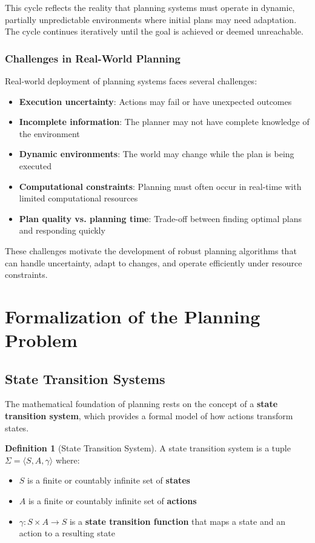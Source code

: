 \documentclass[11pt,a4paper]{article}
\theoremstyle{definition}
\newtheorem{definition}{Definition}[section]
\theoremstyle{plain}
\theoremstyle{remark}
\begin{document}
This cycle reflects the reality that planning systems must operate in dynamic, partially unpredictable environments where initial plans may need adaptation. The cycle continues iteratively until the goal is achieved or deemed unreachable.

\subsubsection{Challenges in Real-World Planning}

Real-world deployment of planning systems faces several challenges:

\begin{itemize}
    \item \textbf{Execution uncertainty}: Actions may fail or have unexpected outcomes
    \item \textbf{Incomplete information}: The planner may not have complete knowledge of the environment
    \item \textbf{Dynamic environments}: The world may change while the plan is being executed
    \item \textbf{Computational constraints}: Planning must often occur in real-time with limited computational resources
    \item \textbf{Plan quality vs. planning time}: Trade-off between finding optimal plans and responding quickly
\end{itemize}

These challenges motivate the development of robust planning algorithms that can handle uncertainty, adapt to changes, and operate efficiently under resource constraints.

\newpage

\section{Formalization of the Planning Problem}

\subsection{State Transition Systems}

The mathematical foundation of planning rests on the concept of a \textbf{state transition system}, which provides a formal model of how actions transform states.

\begin{definition}[State Transition System]
A state transition system is a tuple $\Sigma = \langle S, A, \gamma \rangle$ where:
\begin{itemize}
    \item $S$ is a finite or countably infinite set of \textbf{states}
    \item $A$ is a finite or countably infinite set of \textbf{actions}
    \item $\gamma : S \times A \rightarrow S$ is a \textbf{state transition function} that maps a state and an action to a resulting state
\end{itemize}
\end{definition}
\end{document}
